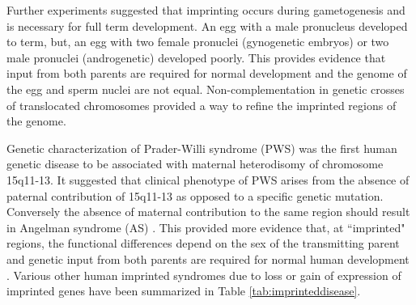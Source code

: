 Further experiments suggested that imprinting occurs during gametogenesis and is necessary for full term development. An egg with a male pronucleus developed to term, but, an egg with two female pronuclei (gynogenetic embryos) or two male pronuclei (androgenetic) developed poorly\cite{Surani1984,McGrath:1984ky}. This provides evidence that input from both parents are required for normal development and the genome of the egg and sperm nuclei are not equal. Non-complementation in genetic crosses of translocated chromosomes provided a way to refine the imprinted regions of the genome\cite{Cattanach:1985hu}. 

Genetic characterization of Prader-Willi syndrome (PWS) was the first human genetic disease to be associated with maternal heterodisomy of chromosome 15q11-13\cite{Nicholls:vh}. It suggested that clinical phenotype of PWS arises from the absence of paternal contribution of 15q11-13 as opposed to a specific genetic mutation. Conversely the absence of maternal contribution to the same region should result in Angelman syndrome (AS) \cite{Nicholls:vh,Reik:1989el}. This provided more evidence that, at ``imprinted" regions, the functional differences depend on the sex of the transmitting parent and genetic input from both parents are required for normal human development \cite{Nicholls:vh}. Various other human imprinted syndromes due to loss or gain of expression of imprinted genes have been summarized in Table \ref{tab:imprinteddisease}.


